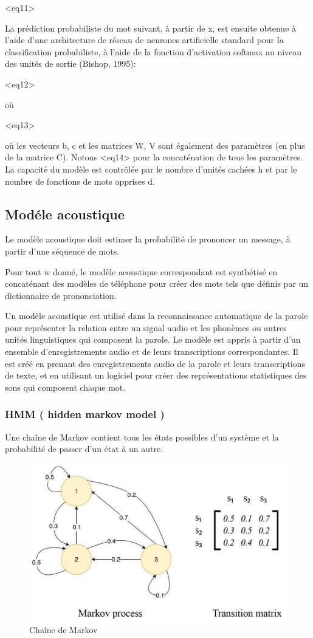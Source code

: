 \documentclass[a4paper, 12pt]{book}
\begin{document}
<eq11>

La prédiction probabiliste du mot suivant, à partir de x, est ensuite obtenue à l'aide d'une architecture de réseau de neurones artificielle standard pour la classification probabiliste, à l'aide de la fonction d'activation softmax au niveau des unités de sortie (Bishop, 1995):

<eq12>

où

<eq13>

où les vecteurs b, c et les matrices W, V sont également des paramètres (en plus de la matrice C). Notons <eq14>  pour la concaténation de tous les paramètres. La capacité du modèle est contrôlée par le nombre d'unités cachées h et par le nombre de fonctions de mots apprises d.

\subsection{Modéle acoustique}

Le modèle acoustique doit estimer la probabilité de prononcer un message, à partir d'une séquence de mots.

Pour tout w donné, le modèle acoustique correspondant est synthétisé en concaténant des modèles de téléphone pour créer des mots tels que définis par un dictionnaire de prononciation.

Un modèle acoustique est utilisé dans la reconnaissance automatique de la parole pour représenter la relation entre un signal audio et les phonèmes ou autres unités linguistiques qui composent la parole. Le modèle est appris à partir d'un ensemble d'enregistrements audio et de leurs transcriptions correspondantes. Il est créé en prenant des enregistrements audio de la parole et leurs transcriptions de texte, et en utilisant un logiciel pour créer des représentations statistiques des sons qui composent chaque mot.

\subsubsection{HMM ( hidden markov model )}

Une chaîne de Markov contient tous les états possibles d'un système et la probabilité de passer d'un état à un autre.

\begin{figure}[htbp]
  \centering
  \includegraphics[width=0.7\linewidth]{fig/markov.png}
  \caption{Chaîne de Markov}
\end{figure}
\end{document}
